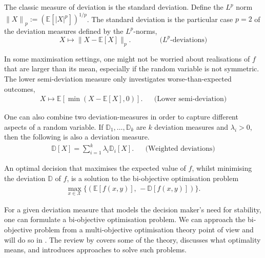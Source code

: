 \documentclass[main.tex]{subfiles}
\begin{document}
\begin{example}
  The classic measure of deviation is the standard deviation.
  Define the $L^p$ norm ${\|X\|}_p := {\left( \mathbb{E}[{|X|}^p]
    \right)}^{1/p}$.
  The standard deviation is
  the particular case $p=2$ of the deviation measures defined by
  the $L^p$-norms,
  \begin{equation}
    X\mapsto
    \|X-\mathbb{E}[X]\|_p.
    \qquad\qquad \text{($L^p$-deviations)}
  \end{equation}

  In some maximisation settings, one might not be worried about
  realisations of $f$ that are larger than its mean, especially if the
  random variable is not symmetric.
  The lower semi-deviation measure only investigates
  worse-than-expected outcomes,
  \begin{align}
    X\mapsto \mathbb{E}[\min(X-\mathbb{E}[X],0)].
    &&\text{(Lower semi-deviation)}
  \end{align}

  One can also combine two deviation-measures in order to capture
  different aspects of a random variable.
  If $\mathbb{D}_1,\dots,\mathbb{D}_k$ are $k$ deviation measures and
  $\lambda_i>0$, then the following
  is also a deviation measure.
  \begin{align}
    \mathbb{D}[X]=\sum_{i=1}^k\lambda_i\mathbb{D}_i[X].
    &&\text{(Weighted deviations)}
  \end{align}
\end{example}


\begin{problem}
  An optimal decision that maximises the expected value of $f$, whilst
  minimising the deviation $\mathbb{D}$ of $f$, is a solution to the
  bi-objective optimisation problem
  \begin{align}
    \max_{x\in\mathcal{X}}\{(\mathbb{E}[f(x,y)],\,-\mathbb{D}[f(x,y)])\}.
  \end{align}
\end{problem}
For a given deviation measure that models the decision maker's
need for stability, one can formulate a bi-objective optimisation
problem.
We can approach the bi-objective problem from a multi-objective
optimisation theory point of view and will do so in
.
The review by \citet{marler2004survey} covers some of the theory,
discusses what optimality means, and introduces approaches to solve
such problems.
\end{document}
